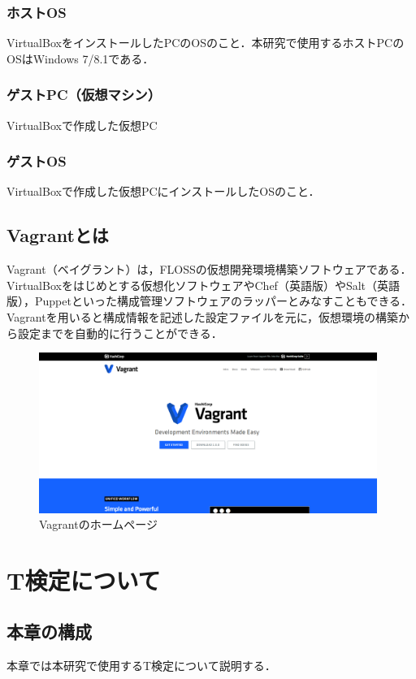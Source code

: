 \subsection{ホストOS}
VirtualBoxをインストールしたPCのOSのこと．本研究で使用するホストPCのOSはWindows 7/8.1である． 

\subsection{ゲストPC（仮想マシン）}
VirtualBoxで作成した仮想PC

\subsection{ゲストOS}
VirtualBoxで作成した仮想PCにインストールしたOSのこと．
\clearpage

\section{Vagrantとは}
Vagrant（ベイグラント）は，FLOSSの仮想開発環境構築ソフトウェアである．VirtualBoxをはじめとする仮想化ソフトウェアやChef（英語版）やSalt（英語版），Puppetといった構成管理ソフトウェアのラッパーとみなすこともできる．Vagrantを用いると構成情報を記述した設定ファイルを元に，仮想環境の構築から設定までを自動的に行うことができる．
\begin{figure}[htb]
\centering
\includegraphics[width=11cm]{06.png}
\caption{Vagrantのホームページ}\label{6}
\end{figure}

\chapter{T検定について}

\section{本章の構成}
本章では本研究で使用するT検定について説明する．


